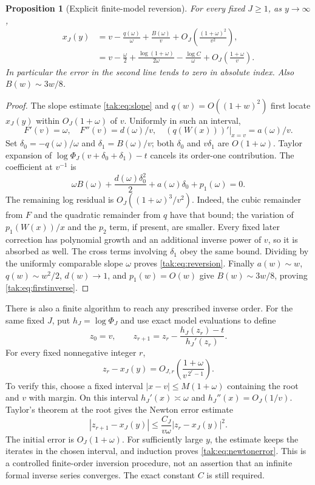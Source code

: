 \documentclass[11pt,letterpaper]{article}
\newtheorem{proposition}[theorem]{Proposition}
\theoremstyle{remark}\newtheorem{remark}[theorem]{Remark}
\begin{document}
\begin{proposition}[Explicit finite-model reversion]\label{tak:prop:reversion}
For every fixed $J\geq1$, as $y\to\infty$,
\begin{align}
 x_J(y)
 &=v-\frac{q(\omega)}{\omega}+\frac{B(\omega)}v
       +O_J\!\left(\frac{(1+\omega)^2}{v^2}\right),\label{tak:eq:reversion}\\
 &=v-\frac\omega2+\frac{\log(1+\omega)}{2\omega}
          -\frac{\log C}{\omega}
       +O_J\!\left(\frac{1+\omega}{v}\right).\label{tak:eq:firstinverse}
\end{align}
In particular the error in the second line tends to zero in absolute index. Also $B(w)\sim3w/8$.
\end{proposition}
\begin{proof}
The slope estimate \eqref{tak:eq:slope} and $q(w)=O((1+w)^2)$ first locate $x_J(y)$ within $O_J(1+\omega)$ of $v$. Uniformly in such an interval,
\[
 F'(v)=\omega,\quad F''(v)=d(\omega)/v,\quad
 (q(W(x)))'\big|_{x=v}=a(\omega)/v.
\]
Set $\delta_0=-q(\omega)/\omega$ and $\delta_1=B(\omega)/v$; both $\delta_0$ and $v\delta_1$ are $O(1+\omega)$. Taylor expansion of $\log\Phi_J(v+\delta_0+\delta_1)-t$ cancels its order-one contribution. The coefficient at $v^{-1}$ is
\[
 \omega B(\omega)+\frac{d(\omega)\delta_0^2}{2}
                   +a(\omega)\delta_0+p_1(\omega)=0.
\]
The remaining log residual is $O_J((1+\omega)^3/v^2)$. Indeed, the cubic remainder from $F$ and the quadratic remainder from $q$ have that bound; the variation of $p_1(W(x))/x$ and the $p_2$ term, if present, are smaller. Every fixed later correction has polynomial growth and an additional inverse power of $v$, so it is absorbed as well. The cross terms involving $\delta_1$ obey the same bound. Dividing by the uniformly comparable slope $\omega$ proves \eqref{tak:eq:reversion}. Finally $a(w)\sim w$, $q(w)\sim w^2/2$, $d(w)\to1$, and $p_1(w)=O(w)$ give $B(w)\sim3w/8$, proving \eqref{tak:eq:firstinverse}.
\end{proof}

There is also a finite algorithm to reach any prescribed inverse order. For the same fixed $J$, put $h_J=\log\Phi_J$ and use exact model evaluations to define
\begin{equation}
 z_0=v,\qquad z_{r+1}=z_r-\frac{h_J(z_r)-t}{h_J'(z_r)}.
 \label{tak:eq:newton}
\end{equation}
For every fixed nonnegative integer $r$,
\begin{equation}
 z_r-x_J(y)=O_{J,r}\!\left(\frac{1+\omega}{v^{\,2^r-1}}\right).
 \label{tak:eq:newtonerror}
\end{equation}
To verify this, choose a fixed interval $|x-v|\leq M(1+\omega)$ containing the root and $v$ with margin. On this interval $h_J'(x)\asymp\omega$ and $h_J''(x)=O_J(1/v)$. Taylor's theorem at the root gives the Newton error estimate
\[
 |z_{r+1}-x_J(y)|\leq\frac{C_J}{v\omega}|z_r-x_J(y)|^2.
\]
The initial error is $O_J(1+\omega)$. For sufficiently large $y$, the estimate keeps the iterates in the chosen interval, and induction proves \eqref{tak:eq:newtonerror}. This is a controlled finite-order inversion procedure, not an assertion that an infinite formal inverse series converges. The exact constant $C$ is still required.
\end{document}
